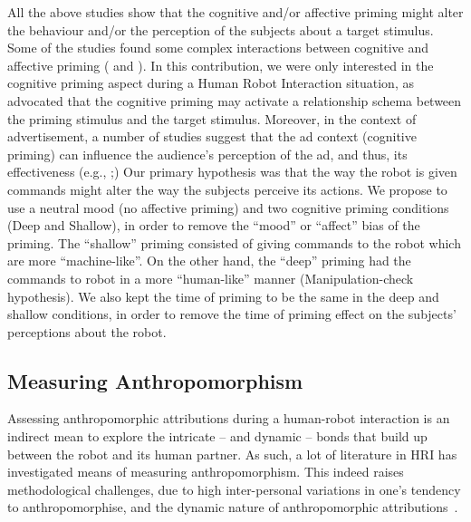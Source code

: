 \documentclass[lettersize, noapacite, twoside, HRI]{apa_HRI}
\begin{document}
All the above studies show that the cognitive and/or affective priming might alter the behaviour and/or the perception of the subjects about a target stimulus. Some of the studies found some complex interactions between cognitive and affective priming (\cite{yi1990cognitive} and \cite{storbeck2008affective} ). In this contribution, we were only interested in the cognitive priming aspect during a Human Robot Interaction situation, as \cite{baldwin1990priming} advocated that the cognitive priming may activate a relationship schema between the priming stimulus and the target stimulus. Moreover, in the context of advertisement, a number of studies suggest that the ad context (cognitive priming) can influence the audience's perception of the ad, and thus, its effectiveness (e.g., \cite{singh1987arousal};\cite{soldow1981response})  Our primary hypothesis was that the way the robot is given commands might alter the way the subjects perceive its actions. We propose to use a neutral mood (no affective priming) and two cognitive priming conditions (Deep and Shallow), in order to remove the ``mood'' or  ``affect'' bias of the priming. The ``shallow'' priming consisted of giving commands to the robot which are more ``machine-like''. On the other hand, the ``deep'' priming had the commands to robot in a more ``human-like'' manner (Manipulation-check hypothesis). We also kept the time of priming to be the same in the deep and shallow conditions, in order to remove the time of priming effect on the subjects' perceptions about the robot. 


\subsection{Measuring Anthropomorphism}

Assessing anthropomorphic attributions during a human-robot interaction is an
indirect mean to explore the intricate -- and dynamic -- bonds that build up
between the robot and its human partner. As such, a lot of literature in HRI has
investigated means of measuring anthropomorphism. This indeed raises 
methodological challenges, due to high inter-personal variations in
one's tendency to anthropomorphise, and the dynamic nature of
anthropomorphic attributions~\citep{lemaignan2014dynamics}.
\end{document}
